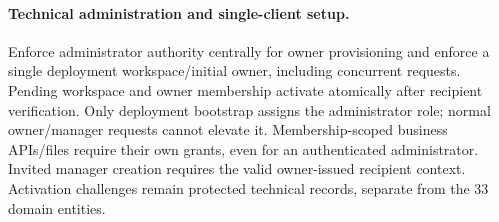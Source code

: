 \paragraph{Technical administration and single-client setup.}
Enforce administrator authority centrally for owner provisioning and enforce a
single deployment workspace/initial owner, including concurrent requests. Pending
workspace and owner membership activate atomically after recipient verification.
Only deployment bootstrap assigns the administrator role; normal owner/manager
requests cannot elevate it. Membership-scoped business APIs/files require their
own grants, even for an authenticated administrator. Invited manager creation
requires the valid owner-issued recipient context. Activation challenges remain
protected technical records, separate from the 33 domain entities.
